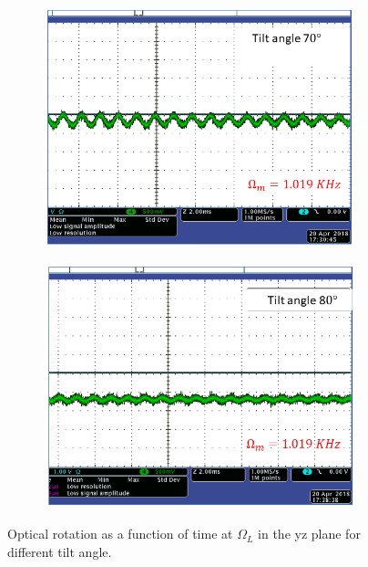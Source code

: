 \begin{figure}
\begin{subfigure}[b]{0.45\textwidth}
        \caption{}
        \label{fig:tilt_40_degree}
    \end{subfigure}
    \begin{subfigure}[b]{0.45\textwidth}
        \centering
        \includegraphics[width=\textwidth,trim={0cm 0.5cm 3.2cm 0cm},clip]{figures/tilt3.png}
        \caption{}
        \label{fig:tilt_70_degree}
    \end{subfigure}
     \hfill
    \begin{subfigure}[b]{0.45\textwidth}
        \centering
        \includegraphics[width=\textwidth,trim={0.5cm 0.5cm 2.9cm 0cm},clip]{figures/tilt4.png}
        \caption{}
        \label{fig:tilt_80_degree}
    \end{subfigure}
    \caption{Optical rotation as a function of time at $\Omega_L$ in the yz plane for different tilt angle.\label{fig:optical-rotation-different-angle}}
\end{figure}
